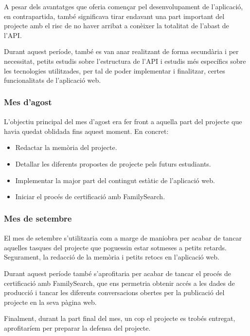             A pesar dels avantatges que oferia començar pel desenvolupament de l'aplicació, en contrapartida, també significava tirar endavant una part important del projecte amb el risc de no haver arribat a conèixer la totalitat de l'abast de l'\gls{API}.

            Durant aquest període, també es van anar realitzant de forma secundària i per necessitat, petits estudis sobre l’estructura de l’API i estudis més específics sobre les tecnologies utilitzades, per tal de poder implementar i finalitzar, certes funcionalitats de l’aplicació web.

        \subsubsection{Mes d'agost}

            \paragraph{}
            L'objectiu principal del mes d'agost era fer front a aquella part del projecte que havia quedat oblidada fins aquest moment. En concret:

            \begin{itemize}
                \item Redactar la memòria del projecte.
                \item Detallar les diferents propostes de projecte pels futurs estudiants.
                \item Implementar la major part del contingut estàtic de l'aplicació web.
                \item Iniciar el procés de certificació amb FamilySearch.
            \end{itemize}

        \subsubsection{Mes de setembre}

            \paragraph{}
            El mes de setembre s'utilitzaria com a marge de maniobra per acabar de tancar aquelles tasques del projecte que poguessin estar sotmeses a petits retards. Segurament, la redacció de la memòria i petits retocs en l'aplicació web.

            Durant aquest període també s'aprofitaria per acabar de tancar el procés de certificació amb FamilySearch, que ens permetria obtenir accés a les dades de producció i tancar les diferents conversacions obertes per la publicació del projecte en la seva pàgina web.

            Finalment, durant la part final del mes, un cop el projecte es trobés entregat, aprofitaríem per preparar la defensa del projecte.

